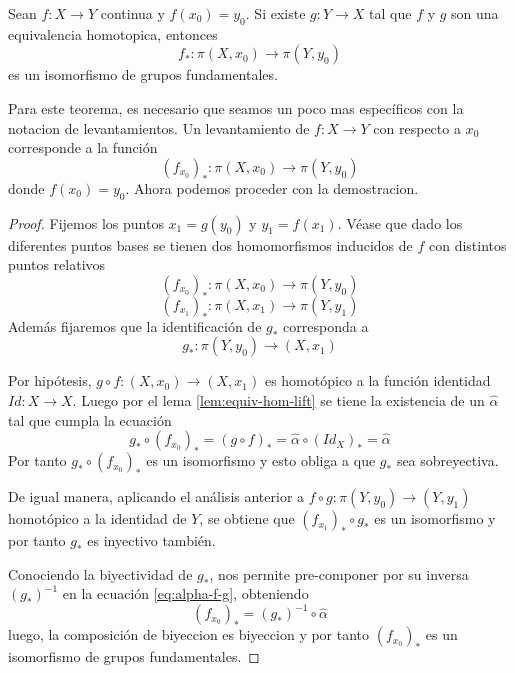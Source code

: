 \begin{teorema}
  Sean \(f : X \to Y\) continua y \(f (x_0) = y_0\). Si existe \(g : Y
  \to X\) tal que \(f\) y \(g\) son una equivalencia homotopica, entonces
  \[ f_* : \pi (X, x_0) \to \pi (Y, y_0)\]
  es un isomorfismo de grupos fundamentales.
\end{teorema}
\noindent Para este teorema, es necesario que seamos un poco mas
específicos con la notacion de levantamientos. Un levantamiento de \(f :
X \to Y\) con respecto a \(x_0\) corresponde a la función
\[ (f_{x_0})_{*} : \pi (X , x_0) \to \pi (Y, y_0)\]
donde \(f(x_0) = y_0\). Ahora podemos proceder con la demostracion.
\begin{proof}
  Fijemos los puntos \(x_1 = g(y_0)\) y \(y_1 = f(x_1)\). Véase que dado
  los diferentes puntos bases se tienen dos homomorfismos inducidos de
  \(f\) con distintos puntos relativos
  \[(f_{x_0})_* : \pi (X, x_0) \to \pi (Y, y_0)\]
  \[(f_{x_1})_* : \pi (X, x_1) \to \pi (Y, y_1)\]
  Además fijaremos que la identificación de \(g_*\) corresponda a
  \[ g_* : \pi (Y, y_0) \to (X, x_1) \]

  Por hipótesis, \(g \circ f : (X, x_0) \to (X, x_1)\) es homotópico a
  la función identidad \(Id : X \to X\). Luego por el lema
  \ref{lem:equiv-hom-lift} se tiene la existencia de un \(\hat \alpha\)
  tal que cumpla la ecuación
  \begin{equation} \label{eq:alpha-f-g}
  g_* \circ (f_{x_0})_* = (g \circ f)_* = \hat \alpha \circ (Id_X)_*
    = \hat \alpha
  \end{equation}
  Por tanto \(g_* \circ (f_{x_0})_*\) es un isomorfismo y esto obliga a
  que \(g_*\) sea sobreyectiva.

  De igual manera, aplicando el análisis anterior a \(f \circ g : \pi
  (Y, y_0) \to (Y, y_1)\) homotópico a la identidad de \(Y\), se
  obtiene que \((f_{x_1})_* \circ g_*\) es un isomorfismo y por tanto
  \(g_*\) es inyectivo también.

  Conociendo la biyectividad de \(g_*\), nos permite pre-componer por su
  inversa \((g_*)^{-1}\) en la ecuación \eqref{eq:alpha-f-g}, obteniendo
  \[ (f_{x_0})_* = (g_*)^{-1} \circ \hat \alpha\]
  luego, la composición de biyeccion es biyeccion y por tanto
  \((f_{x_0})_*\) es un isomorfismo de grupos fundamentales.
\end{proof}

